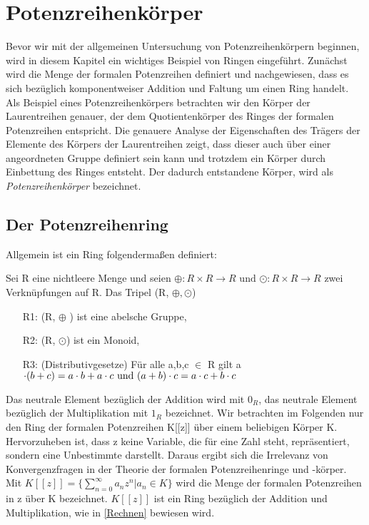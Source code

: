 \chapter{Potenzreihenkörper}\label{chap3}
%
Bevor wir mit der allgemeinen Untersuchung von Potenzreihenkörpern beginnen, wird in diesem Kapitel ein wichtiges Beispiel von Ringen eingeführt. Zunächst wird die Menge der formalen Potenzreihen definiert und nachgewiesen, dass es sich bezüglich komponentweiser Addition und Faltung um einen Ring handelt. Als Beispiel eines Potenzreihenkörpers betrachten wir den Körper der Laurentreihen genauer, der dem Quotientenkörper des Ringes der formalen Potenzreihen entspricht. Die genauere Analyse der Eigenschaften des Trägers der Elemente des Körpers der Laurentreihen zeigt, dass dieser auch über einer angeordneten Gruppe definiert sein kann und trotzdem ein Körper durch Einbettung des Ringes entsteht. Der dadurch entstandene Körper, wird als \textit{Potenzreihenkörper} bezeichnet. \\ 
\section{Der Potenzreihenring}
Allgemein ist ein Ring folgendermaßen definiert:
\begin{defn}\label{Ring} %
\cite{fischer08} Sei R eine nichtleere Menge und seien $\oplus: R \times R \to R \text{ und } \odot: R \times R \to R $ zwei Verknüpfungen auf R. Das Tripel (R, $\oplus, \odot$)
%
\begin{enumerate}
\item[R1:] (R, $\oplus$ ) ist eine abelsche Gruppe,
\item[R2:] (R, $\odot$) ist ein Monoid,
\item[R3:] (Distributivgesetze) Für alle a,b,c $\in$ R gilt a $\cdot(b +c) = a \cdot b + a \cdot c \text{ und } \\
(a+b) \cdot c = a \cdot c + b \cdot c $  
\end{enumerate}
\end{defn}
Das neutrale Element bezüglich der Addition wird mit \textbf{$0_R$}, das neutrale Element bezüglich der Multiplikation mit \textbf{$1_R$} bezeichnet.
%
Wir betrachten im Folgenden nur den Ring der formalen Potenzreihen K[[z]] über einem beliebigen Körper K. Hervorzuheben ist, dass z keine Variable, die für eine Zahl steht, repräsentiert, sondern eine Unbestimmte darstellt. Daraus ergibt sich die Irrelevanz von Konvergenzfragen in der Theorie der formalen Potenzreihenringe und -körper.
Mit $K [[z]] = \lbrace \sum_{n=0}^\infty a_n z^n \vert a_n\in K \rbrace $ wird die Menge der formalen Potenzreihen in z über K bezeichnet. $K [[z]] $ ist ein Ring bezüglich der Addition und Multiplikation, wie in \ref{Rechnen} bewiesen wird. 

